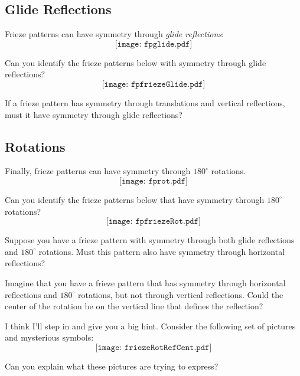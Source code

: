 \documentclass{ximera}
\begin{document}
\subsection*{Glide Reflections}

Frieze patterns can have symmetry through \textit{glide reflections}:
\[
\texttt{[image: fpglide.pdf]}
\]

\begin{question}
Can you identify the frieze patterns below with symmetry through glide
reflections?
\[
\texttt{[image: fpfriezeGlide.pdf]}
\]
\end{question}

\begin{question}
If a frieze pattern has symmetry through translations and vertical
reflections, must it have symmetry through glide reflections?
\end{question}





\subsection*{Rotations}

Finally, frieze patterns can have symmetry through $180^\circ$
rotations.
\[
\texttt{[image: fprot.pdf]}
\]

\begin{question}
Can you identify the frieze patterns below that have symmetry through
$180^\circ$ rotations?
\[
\texttt{[image: fpfriezeRot.pdf]}
\]
\end{question}

\begin{question}
Suppose you have a frieze pattern with symmetry through both glide
reflections and $180^\circ$ rotations. Must this pattern also have
symmetry through horizontal reflections?
\end{question}



\begin{question}
Imagine that you have a frieze pattern that has symmetry through
horizontal reflections and $180^\circ$ rotations, but not through
vertical reflections. Could the center of the rotation be on the
vertical line that defines the reflection?
\end{question}

I think I'll step in and give you a big hint. Consider the following
set of pictures and mysterious symbols:
\[
\texttt{[image: friezeRotRefCent.pdf]}
\]
\begin{question}
Can you explain what these pictures are trying to express?
\end{question}
\end{document}
